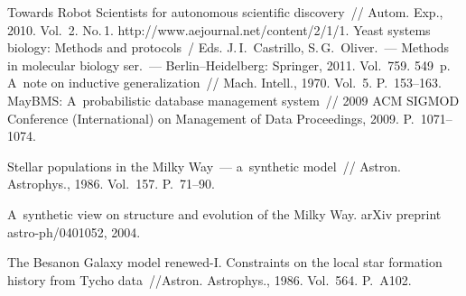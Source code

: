 \begin{multicols}{2}
{{\begin{thebibliography}{99}
 Towards Robot Scientists for autonomous scientific discovery~//
Autom. Exp., 2010.  Vol.~2. No.\,1. {\sf
http://www.aejournal.net/content/2/1/1}.
Yeast systems biology: Methods and protocols~/
Eds. J.\,I.~Castrillo,  S.\,G.~Oliver.~---  Methods in molecular biology ser.~---
Berlin--Heidelberg: Springer, 2011. Vol.~759. 549~p.
 A~note on inductive generalization~// Mach. Intell.,
1970.  Vol.~5. P.~153--163.
 MayBMS: A~probabilistic database
management system~// 2009 ACM SIGMOD Conference (International) on
Management of Data Proceedings, 2009. P.~1071--1074.

 Stellar populations in
the Milky Way~--- a~synthetic model~// Astron. Astrophys., 1986. Vol.~157.
P.~71--90.

 A~synthetic view on structure and evolution of the Milky Way.
arXiv preprint astro-ph/0401052, 2004.

The Besan{\!\fontsize{10pt}{10pt}\selectfont{}}on
Galaxy model renewed-I. Constraints on the local star formation history from Tycho
data~//Astron. Astrophys., 1986. Vol.~564. P.~A102.


\end{thebibliography}}}
\end{multicols}
